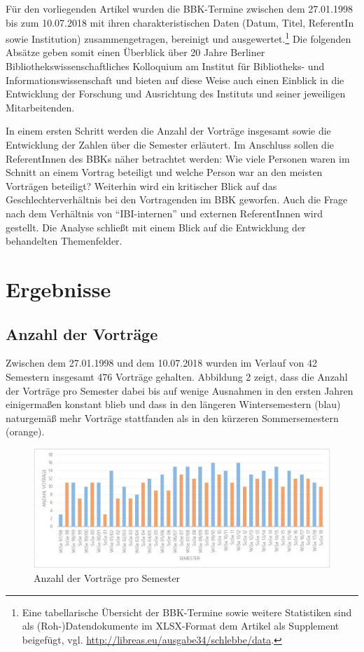 \documentclass[a4paper,
fontsize=11pt,
oneside,
numbers=noperiodatend,
parskip=half-,
bibliography=totoc,
final
]{scrartcl}
\begin{document}
Für den vorliegenden Artikel wurden die BBK-Termine zwischen dem
27.01.1998 bis zum 10.07.2018 mit ihren charakteristischen Daten (Datum,
Titel, ReferentIn sowie Institution) zusammengetragen, bereinigt und
ausgewertet.\footnote{Eine tabellarische Übersicht der BBK-Termine sowie
  weitere Statistiken sind als (Roh-)Datendokumente im XLSX-Format dem
  Artikel als Supplement beigefügt, vgl. \url{http://libreas.eu/ausgabe34/schlebbe/data}.} Die folgenden Absätze geben somit
einen Überblick über 20 Jahre Berliner Bibliothekswissenschaftliches
Kolloquium am Institut für Bibliotheks- und Informationswissenschaft und
bieten auf diese Weise auch einen Einblick in die Entwicklung der
Forschung und Ausrichtung des Instituts und seiner jeweiligen
Mitarbeitenden.

In einem ersten Schritt werden die Anzahl der Vorträge insgesamt sowie
die Entwicklung der Zahlen über die Semester erläutert. Im Anschluss
sollen die ReferentInnen des BBKs näher betrachtet werden: Wie viele
Personen waren im Schnitt an einem Vortrag beteiligt und welche Person
war an den meisten Vorträgen beteiligt? Weiterhin wird ein kritischer
Blick auf das Geschlechterverhältnis bei den Vortragenden im BBK
geworfen. Auch die Frage nach dem Verhältnis von \enquote{IBI-internen}
und externen ReferentInnen wird gestellt. Die Analyse schließt mit einem
Blick auf die Entwicklung der behandelten Themenfelder.

\hypertarget{ergebnisse}{%
\section{Ergebnisse}\label{ergebnisse}}

\hypertarget{anzahl-der-vortruxe4ge}{%
\subsection{Anzahl der Vorträge}\label{anzahl-der-vortruxe4ge}}

Zwischen dem 27.01.1998 und dem 10.07.2018 wurden im Verlauf von 42
Semestern insgesamt 476 Vorträge gehalten. Abbildung 2 zeigt, dass die
Anzahl der Vorträge pro Semester dabei bis auf wenige Ausnahmen in den
ersten Jahren einigermaßen konstant blieb und dass in den längeren
Wintersemestern (blau) naturgemäß mehr Vorträge stattfanden als in den
kürzeren Sommersemestern (orange).

\begin{figure}[h!]
\centering
\includegraphics[width=15cm]{img/Abbildung2.JPG}
\caption{Anzahl der Vorträge pro Semester}
\end{figure}
\end{document}
